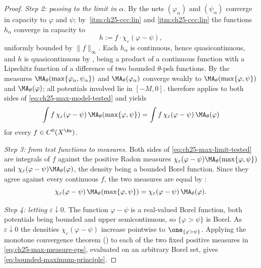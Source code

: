 \begin{proof}
\emph{Step 2: passing to the limit in $\alpha$.}  By
 the nets
$(\varphi_\alpha)$ and $(\psi_\alpha)$ converge in capacity to
$\varphi$ and $\psi$; by
\,\cref{itm:ch25-ccc:lin} and
\cref{itm:ch25-ccc:lip} the functions
$h_\alpha$ converge in capacity to
\[
 h:=f\cdot\chi_\varepsilon(\varphi-\psi),
\]
uniformly bounded by $\|f\|_\infty$.  Each $h_\alpha$ is continuous,
hence quasicontinuous, and $h$ is quasicontinuous by
, being a product of a continuous
function with a Lipschitz function of a difference of two bounded
$\theta$-psh functions.  By  the measures
$\MA_\theta(\max\{\varphi_\alpha,\psi_\alpha\})$ and
$\MA_\theta(\varphi_\alpha)$ converge weakly to
$\MA_\theta(\max\{\varphi,\psi\})$ and $\MA_\theta(\varphi)$; all
potentials involved lie in $[-M,0]$.   therefore
applies to both sides of \eqref{eq:ch25-max-model-tested} and yields
\begin{equation}
\label{eq:ch25-max-limit-tested}
 \int f\,\chi_\varepsilon(\varphi-\psi)\,
   \MA_\theta(\max\{\varphi,\psi\})
 =\int f\,\chi_\varepsilon(\varphi-\psi)\,\MA_\theta(\varphi)
\end{equation}
for every $f\in C^0(X^{\An})$.

\emph{Step 3: from test functions to measures.}  Both sides of
\eqref{eq:ch25-max-limit-tested} are integrals of $f$ against the positive
Radon measures $\chi_\varepsilon(\varphi-\psi)\MA_\theta(\max\{\varphi,
\psi\})$ and $\chi_\varepsilon(\varphi-\psi)\MA_\theta(\varphi)$, the
density being a bounded Borel function.  Since they agree against every
continuous $f$, the two measures are equal by
:
\begin{equation}
\label{eq:ch25-max-measure-eps}
 \chi_\varepsilon(\varphi-\psi)\,\MA_\theta(\max\{\varphi,\psi\})
 =\chi_\varepsilon(\varphi-\psi)\,\MA_\theta(\varphi) .
\end{equation}

\emph{Step 4: letting $\varepsilon\downarrow0$.}  The function
$\varphi-\psi$ is a real-valued Borel function, both potentials being
bounded and upper semicontinuous, so $\{\varphi>\psi\}$ is Borel.  As
$\varepsilon\downarrow0$ the densities
$\chi_\varepsilon(\varphi-\psi)$ increase pointwise to
$\one_{\{\varphi>\psi\}}$.  Applying the monotone convergence theorem
() to each of the two fixed positive measures in
\eqref{eq:ch25-max-measure-eps}, evaluated on an arbitrary Borel set, gives
\eqref{eq:bounded-maximum-principle}.


\end{proof}
